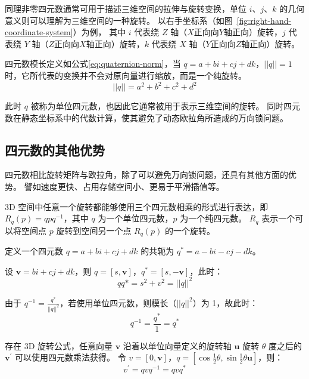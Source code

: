 同理非零四元数通常可用于描述三维空间的拉伸与旋转变换，单位 $i$、$j$、$k$ 的几何意义则可以理解为三维空间的一种旋转。
以右手坐标系（如图~\ref{fig:right-hand-coordinate-system}）为例，
其中 $i$ 代表绕 $Z$ 轴（$X$正向向$Y$轴正向）旋转，$j$ 代表绕 $Y$ 轴（$Z$正向向$X$轴正向）旋转，$k$ 代表绕 $X$ 轴（$Y$正向向$Z$轴正向）旋转。

四元数模长定义如公式\eqref{eq:quaternion-norm}，当 $q=a+bi+cj+dk$，$||q||=1$ 时，它所代表的变换并不会对原向量进行缩放，而是一个纯旋转。
\begin{equation}
  ||q|| = a^2 + b^2 + c^2 + d^2
  \label{eq:quaternion-norm}
\end{equation}

此时 $q$ 被称为单位四元数，也因此它通常被用于表示三维空间的旋转。
同时四元数在静态坐标系中的代数计算，使其避免了动态欧拉角所造成的万向锁问题。

\subsection{四元数的其他优势}

四元数相比旋转矩阵与欧拉角，除了可以避免万向锁问题，还具有其他方面的优势。
譬如速度更快、占用存储空间小、更易于平滑插值等。

3D 空间中任意一个旋转都能够使用三个四元数相乘的形式进行表达，即 $ R_{q}(p) = qpq^{-1} $，其中 $q$ 为一个单位四元数，$p$ 为一个纯四元数。
$ R_{q} $ 表示一个可以将空间点 $p$ 旋转到空间另一个点 $ R_{q}(p) $ 的一个旋转。

定义一个四元数 $ q=a+bi+cj+dk $ 的共轭为 $ q^* = a - bi -cj -dk $。

设 $ \mathbf{v} = bi+cj+dk $，则 $ q=[s,\mathbf{v}] $，$ q^*=[s,-\mathbf{v}] $，此时：
\begin{equation}
qq* = s^2 + v^2 = ||q||^2
\end{equation}

由于 $q^{-1}=\frac{q^*}{||q||^2} $，若使用单位四元数，则模长（$ ||q||^2 $）为 1，故此时：
\begin{equation}
q^{-1} = \frac{q^*}{1} = q^*
\end{equation}

存在 3D 旋转公式，任意向量 $\mathbf{v}$ 沿着以单位向量定义的旋转轴 $\mathbf{u}$ 旋转 $\theta$ 度之后的 $\mathbf{v}^{'}$ 可以使用四元数乘法获得。
令 $v=[0,\mathbf{v}]$，$q=[\cos{\frac{1}{2}\theta},\sin{\frac{1}{2}\theta}\mathbf{u}]$，则：
\begin{equation}
v^{'} = qvq^{-1} = qvq^*
\end{equation}

